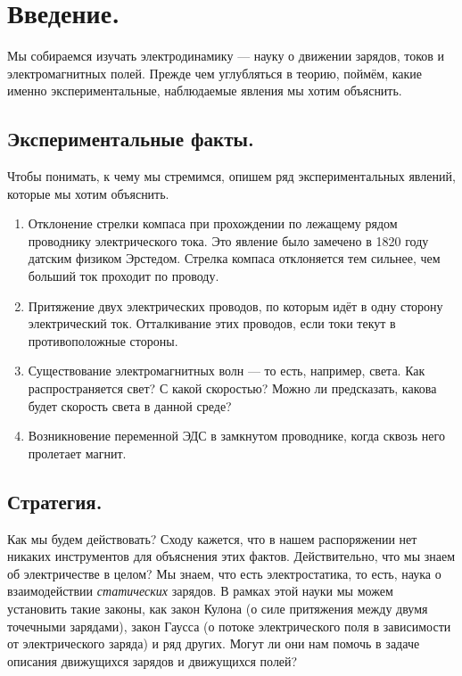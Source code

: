 \documentclass[a4paper,12pt]{article}
\numberwithin{equation}{section}
\begin{document}
\section{Введение.}
\label{sec:intro}

Мы собираемся изучать электродинамику --- науку о движении зарядов,
токов и электромагнитных полей. Прежде чем углубляться в теорию,
поймём, какие именно экспериментальные, наблюдаемые явления мы хотим
объяснить. 

\subsection{Экспериментальные факты.}
\label{sec:exp_facts}

Чтобы понимать, к чему мы стремимся, опишем ряд экспериментальных
явлений, которые мы хотим объяснить. 

\begin{enumerate}
\item Отклонение стрелки компаса при прохождении по лежащему рядом
  проводнику электрического тока. Это явление было замечено в 1820
  году датским физиком Эрстедом. Стрелка компаса отклоняется тем
  сильнее, чем больший ток проходит по проводу.
\item Притяжение двух электрических проводов, по которым идёт в одну
  сторону электрический ток. Отталкивание этих проводов, если токи
  текут в противоположные стороны.
\item Существование электромагнитных волн --- то есть, например,
  света. Как распространяется свет? С какой скоростью? Можно ли
  предсказать, какова будет скорость света в данной среде?
\item Возникновение переменной ЭДС в замкнутом проводнике, когда сквозь него
  пролетает магнит.
\end{enumerate}

\subsection{Стратегия.}
\label{sec:strategy}

Как мы будем действовать? Сходу кажется, что в нашем распоряжении нет
никаких инструментов для объяснения этих фактов. Действительно, что мы
знаем об электричестве в целом? Мы знаем, что есть электростатика, то
есть, наука о взаимодействии \textit{статических} зарядов. В рамках
этой науки мы можем установить такие законы, как закон Кулона (о силе
притяжения между двумя точечными зарядами), закон Гаусса (о потоке
электрического поля в зависимости от электрического заряда) и ряд
других. Могут ли они нам помочь в задаче описания движущихся зарядов и
движущихся полей? 
\end{document}
